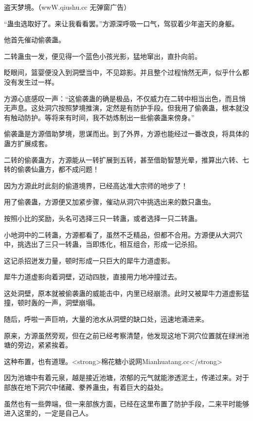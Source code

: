 
\begin{this_body}

盗天梦境。（wwW.qiushu.cc 无弹窗广告）

“蛊虫选取好了。来让我看看罢。”方源深呼吸一口气，驾驭着少年盗天的身躯。

他首先催动偷袭蛊。

二转蛊虫一发，便见得一个蓝色小孩光影，猛地窜出，直扑向前。

眨眼间，篮婴便没入到洞壁当中，不见踪影。并且整个过程悄然无声，似乎什么都没有发生过一样。

方源心底感叹一声：“这偷袭蛊的确是极品，不仅威力在二转中相当出色，而且悄无声息。这处洞穴按照梦境推演，定然是有防护手段。但我用了偷袭蛊，根本就没有触动防护。等将来有时间，我不妨炼制出一些偷袭蛊来傍身。”

偷袭蛊是方源借助梦境，思谋而出。到了外界，方源也能经过一番改良，将具体的蛊方扩展成套。

二转的偷袭蛊方，方源能从一转扩展到五转，甚至借助智慧光晕，推算出六转、七转的偷袭仙蛊方，都不成问题！

因为方源此时此刻的偷道境界，已经高达准大宗师的地步了！

用了偷袭蛊，方源便又加紧步骤，催动从洞穴中挑选出来的数只蛊虫。

按照小比的奖励，头名可选择三只一转蛊，或者选择一只二转蛊。

小地洞中的二转蛊，方源都看了，虽然不乏精品，但都不合用。方源便从大洞穴中，挑选出了三只一转蛊，当即炼化，相互组合，形成一记杀招。

这记杀招迸发力量，顿时形成一只巨大的犀牛力道虚影。

犀牛力道虚影向着洞壁，迈动四肢，直接用力地冲撞过去。

这处洞壁，原本就被偷袭蛊的威能击中，内里已经崩溃。此时又被犀牛力道虚影猛撞，顿时轰的一声，洞壁崩塌。

随后，呼啦一声巨响，大量的池水从洞壁的缺口处，迅速地涌进来。

原来，方源虽然旁观，但在之前已经考察清楚，他发现这地下洞穴位置就在绿洲池塘的旁边，紧紧挨着。

这种布置，也有道理。<strong>棉花糖小说网Mianhuatang.cc</strong>

因为池塘中有着元泉，越是接近池塘，浓郁的元气就能渗透泥土，传递过来。对于部族在地下洞穴中储藏、豢养蛊虫，有着巨大的益处。

虽然也有一些弊端，但一来部族方面，已经在这里布置了防护手段，二来平时能够进入这里的，一定是自己人。


\end{this_body}
